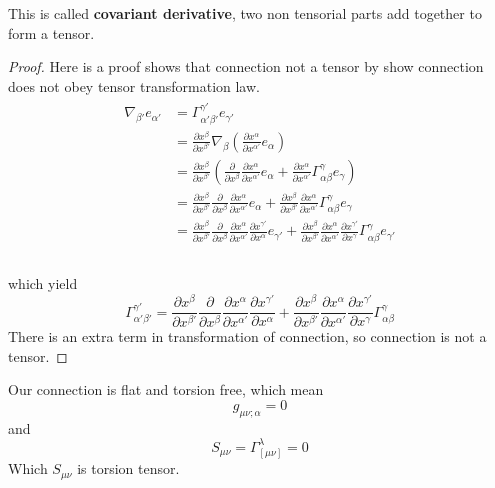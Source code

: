 \documentclass[12pt]{article}
\theoremstyle{mystyle}{\newtheorem{definition}{Definition}[section]}
\theoremstyle{mystyle}{\newtheorem{theorem}[definition]{Theorem}}
\theoremstyle{mystyle}{\newtheorem*{remark}{Remark}}
\theoremstyle{mystyle}{\newtheorem*{example}{Example}}
\theoremstyle{mystyle}{\newtheorem*{examples}{Examples}}
\theoremstyle{cstyle}{\newtheorem*{cthm}{}}
\begin{document}
This is called \textbf{covariant derivative}, two non tensorial parts add together to form a tensor.

\begin{proof}
  Here is a proof shows that connection not a tensor by show connection does not obey tensor transformation law.
  \begin{align*}
    \begin{split}
      \nabla_{\beta'}e_{\alpha'} & = \Gamma^{\gamma'}_{\alpha'\beta'}e_{\gamma'} \\
      &= \frac{\partial x^{\beta}}{\partial x^{\beta'}}\nabla_{\beta}(\frac{\partial x^{\alpha}}{\partial x^{\alpha'}}e_{\alpha})\\
      &= \frac{\partial x^{\beta}}{\partial x^{\beta'}}(\frac{\partial}{\partial x^{\beta}}\frac{\partial x^{\alpha}}{\partial x^{\alpha'}}e_{\alpha}
      + \frac{\partial x^{\alpha}}{\partial x^{\alpha'}} \Gamma ^{\gamma}_{\alpha\beta} e_{\gamma})\\
      &= \frac{\partial x^{\beta}}{\partial x^{\beta'}}\frac{\partial}{\partial x^{\beta}}\frac{\partial x^{\alpha}}{\partial x^{\alpha'}}e_{\alpha}
      + \frac{\partial x^{\beta}}{\partial x^{\beta'}}\frac{\partial x^{\alpha}}{\partial x^{\alpha'}} \Gamma ^{\gamma}_{\alpha\beta} e_{\gamma}\\
      &= \frac{\partial x^{\beta}}{\partial x^{\beta'}}\frac{\partial}{\partial x^{\beta}}\frac{\partial x^{\alpha}}{\partial x^{\alpha'}}\frac{\partial x^{\gamma'}}{\partial x^{\alpha}}e_{\gamma'}
      + \frac{\partial x^{\beta}}{\partial x^{\beta'}}\frac{\partial x^{\alpha}}{\partial x^{\alpha'}} \frac{\partial x^{\gamma'}}{\partial x^{\gamma}} \Gamma ^{\gamma}_{\alpha\beta}  e_{\gamma'}\\
    \end{split}
  \end{align*}
  \\
  which yield \[\Gamma^{\gamma'}_{\alpha'\beta'} = \frac{\partial x^{\beta}}{\partial x^{\beta'}}\frac{\partial}{\partial x^{\beta}}\frac{\partial x^{\alpha}}{\partial x^{\alpha'}}\frac{\partial x^{\gamma'}}{\partial x^{\alpha}}
    + \frac{\partial x^{\beta}}{\partial x^{\beta'}}\frac{\partial x^{\alpha}}{\partial x^{\alpha'}} \frac{\partial x^{\gamma'}}{\partial x^{\gamma}} \Gamma ^{\gamma}_{\alpha\beta}\]
  There is an extra term in transformation of connection, so connection is not a tensor.
\end{proof}
Our connection is flat and torsion free, which mean \[g_{\mu\nu;\alpha} = 0\] and\[S_{\mu\nu} = \Gamma_{[\mu\nu]}^{\lambda} = 0 \]
Which \(S_{\mu\nu}\) is torsion tensor.
\end{document}
